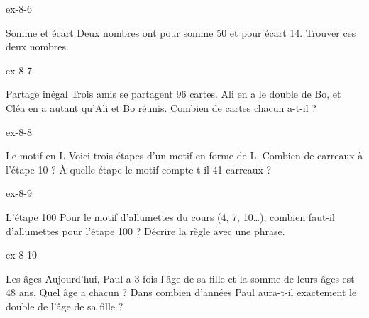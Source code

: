 \begin{blocLivre}{ex-8-6}\begin{exercice}[2]{Somme et écart}
Deux nombres ont pour somme 50 et pour écart 14. Trouver ces deux nombres.
\end{exercice}\end{blocLivre}
\begin{blocLivre}{ex-8-7}\begin{exercice}[2]{Partage inégal}
Trois amis se partagent 96 cartes. Ali en a le double de Bo, et Cléa en a autant qu’Ali et Bo réunis. Combien de cartes chacun a-t-il ?
\end{exercice}\end{blocLivre}
\begin{blocLivre}{ex-8-8}\begin{exercice}[2]{Le motif en L}
Voici trois étapes d’un motif en forme de L. Combien de carreaux à l’étape 10 ? À quelle étape le motif compte-t-il 41 carreaux ?
\label{fig-ex-8-8}
\end{exercice}\end{blocLivre}
\begin{blocLivre}{ex-8-9}\begin{exercice}[2]{L’étape 100}
Pour le motif d’allumettes du cours (4, 7, 10…), combien faut-il d’allumettes pour l’étape 100 ? Décrire la règle avec une phrase.
\end{exercice}\end{blocLivre}
\begin{blocLivre}{ex-8-10}\begin{exercice}[2]{Les âges}
Aujourd’hui, Paul a 3 fois l’âge de sa fille et la somme de leurs âges est 48 ans. Quel âge a chacun ? Dans combien d’années Paul aura-t-il exactement le double de l’âge de sa fille ?
\end{exercice}\end{blocLivre}

